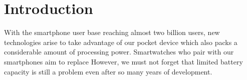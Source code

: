 
\chapter{Introduction} %

\label{Chapter1} %


With the smartphone user base reaching almost two billion users, new technologies arise to take advantage of our pocket device which also packs a considerable amount of processing power.
Smartwatches who pair with our smartphones aim to replace 
However, we must not forget that limited battery capacity is still a problem even after so many years of development.
